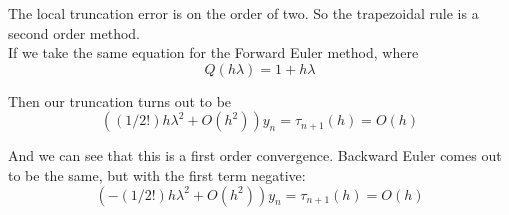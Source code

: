 \documentclass{article}
\begin{document}
The local truncation error is on the order of two. So the trapezoidal rule is a second order method.\\

If we take the same equation for the Forward Euler method, where 
\begin{equation}
    Q(h\lambda) = 1 + h\lambda
\end{equation}

Then our truncation turns out to be
\begin{equation}
    ((1/2!)h\lambda^2 + O(h^2))y_n = \tau_{n+1}(h) = O(h)
\end{equation}

And we can see that this is a first order convergence. Backward Euler comes out to be
the same, but with the first term negative:
\begin{equation}
    (-(1/2!)h\lambda^2 + O(h^2))y_n = \tau_{n+1}(h) = O(h)
\end{equation}
\end{document}
